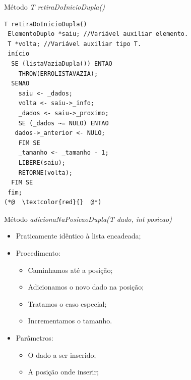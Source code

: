 \documentclass[12pt,table,xcolor={dvipsnames}]{beamer}
\begin{document}
\begin{frame}[fragile]{Método \textit{T retiraDoInicioDupla()}}
\begin{lstlisting}
T retiraDoInicioDupla()
 ElementoDuplo *saiu; //Variável auxiliar elemento.
 T *volta; //Variável auxiliar tipo T.
 início
  SE (listaVaziaDupla()) ENTAO
    THROW(ERROLISTAVAZIA);
  SENAO
    saiu <- _dados;
    volta <- saiu->_info;
    _dados <- saiu->_proximo;
    SE (_dados ~= NULO) ENTAO
   dados->_anterior <- NULO;
    FIM SE
    _tamanho <- _tamanho - 1;
    LIBERE(saiu);
    RETORNE(volta);
  FIM SE
 fim;
(*@  \textcolor{red}{}  @*)
\end{lstlisting}
\end{frame}

\begin{frame}[fragile]{Método \textit{adicionaNaPosicaoDupla(T dado, int posicao)}}

\begin{itemize}
\item Praticamente idêntico à lista encadeada;
\item Procedimento:
\begin{itemize}
\item Caminhamos até a posição;
\item Adicionamos o novo dado na posição;
\item Tratamos o caso especial;
\item Incrementamos o tamanho.
\end{itemize}
\item Parâmetros:
\begin{itemize}
\item O dado a ser inserido;
\item A posição onde inserir;
\end{itemize}
\end{itemize}
\end{frame}
\end{document}
